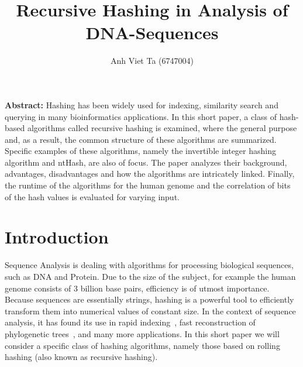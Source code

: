\documentclass[11pt,a4paper]{scrartcl}
\title{ Recursive Hashing in Analysis of DNA-Sequences}
\author{Anh Viet Ta (6747004)}
\begin{document}
\begin{titlepage}
\maketitle
{}%
\thispagestyle{empty}

\textbf{Abstract:} Hashing has been widely used for indexing, similarity
search and querying in many bioinformatics applications. In this short
paper, a class of hash-based algorithms called recursive hashing is
examined, where the general purpose and, as a result, the common structure
of these algorithms are summarized. Specific examples of these algorithms,
namely the invertible integer hashing algorithm and ntHash, are also of focus.
The paper analyzes their background, advantages, disadvantages and how the
algorithms are intricately linked. Finally, the runtime of the
algorithms for the human genome and the correlation of bits of the
hash values is evaluated for varying input.
\end{titlepage}
\setcounter{page}{1}
\section{Introduction}

Sequence Analysis is dealing with algorithms for
processing biological sequences, such as DNA and Protein. Due to the size
of the subject, for example the human genome consists of 3 billion base
pairs,
efficiency is of utmost importance.
Because sequences are essentially strings, hashing is a powerful tool to
efficiently transform them into numerical values of constant size.
In the context of
sequence analysis, it has found its use in rapid indexing~\cite{WU:2016},
fast
reconstruction of phylogenetic trees~\cite{brown2012fast}, and many more
applications.
In this short paper we will consider a specific class of hashing
algorithms, namely those based on rolling hashing (also known as
recursive hashing).
\end{document}
